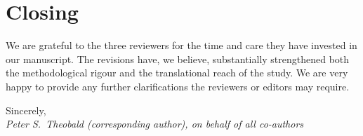 \documentclass[11pt,a4paper]{article}
\begin{document}
\section*{Closing}

We are grateful to the three reviewers for the time and care they have invested
in our manuscript. The revisions have, we believe, substantially strengthened
both the methodological rigour and the translational reach of the study. We
are very happy to provide any further clarifications the reviewers or editors
may require.

\bigskip
\noindent Sincerely,\\
\textit{Peter S.\ Theobald (corresponding author), on behalf of all co-authors}
\end{document}
